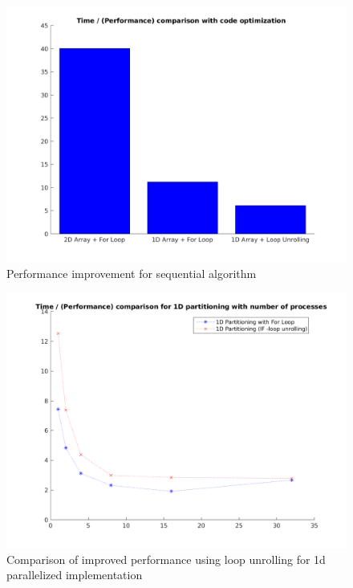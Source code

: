 \documentclass[a4paper, 10pt, conference]{IEEEtran}      %
\begin{document}
	\begin{figure}[h]
		\centering
		\includegraphics[width = 0.9\linewidth]{code_optimization}
		\caption{Performance improvement for sequential algorithm}
		\label{perimp}
	\end{figure}
	
	\begin{figure}[h]
		\centering
		\includegraphics[width = 0.9\linewidth]{1d_optimization}
		\caption{Comparison of improved performance using loop unrolling for 1d parallelized implementation}
		\label{1doptimization}
	\end{figure}
	
\end{document}
